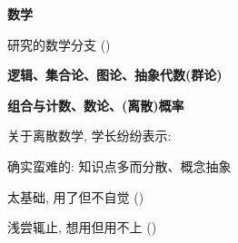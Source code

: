 
\begin{frame}{}
\end{frame}

\begin{frame}{}
  \begin{center}
    {\bf \Large {}数学}

    \pause
    \vspace{0.50cm}
    研究的数学分支 ()
  \end{center}
\end{frame}

\begin{frame}{}
  \begin{center}
    {\bf \large {} 逻辑、集合论、图论、抽象代数(群论)}


    {\bf {} 组合与计数、数论、(离散)概率}
  \end{center}
\end{frame}

\begin{frame}{}
  \begin{center}
    {\large 关于离散数学, 学长纷纷表示:}

    \vspace{0.80cm}


    \vspace{0.60cm}

  \end{center}
\end{frame}

\begin{frame}{}
  \begin{center}

    \pause
    \vspace{0.80cm}
    {\large 确实蛮难的: 知识点多而分散、概念抽象}
  \end{center}
\end{frame}

\begin{frame}{}
  \begin{center}

    \pause
    \vspace{0.80cm}
    {\large 太基础, 用了但不自觉 ()}

    \vspace{0.50cm}
    {\large 浅尝辄止, 想用但用不上 ()}
  \end{center}
\end{frame}

